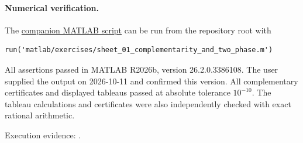 \documentclass[11pt,a4paper]{article}
\begin{document}
\paragraph{Numerical verification.}
The
\href{run:matlab/exercises/sheet_01_complementarity_and_two_phase.m}
{companion MATLAB script} can be run from the repository root with
\begin{lstlisting}
run('matlab/exercises/sheet_01_complementarity_and_two_phase.m')
\end{lstlisting}
All assertions passed in MATLAB R2026b, version 26.2.0.3386108.
The user supplied the output on 2026-10-11 and confirmed this version.
All complementary certificates and displayed tableaus passed at absolute
tolerance $10^{-10}$. The tableau calculations and certificates were also
independently checked with exact rational arithmetic.

Execution evidence: .
\end{document}
